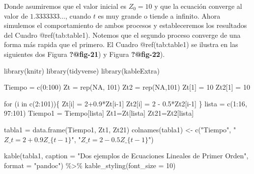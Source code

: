 \documentclass[
  a4paper,
]{article}
\newenvironment{Shaded}{}{}
\newcommand{\AttributeTok}[1]{\textcolor[rgb]{0.84,0.23,0.29}{#1}}
\newcommand{\ConstantTok}[1]{\textcolor[rgb]{0.00,0.36,0.77}{#1}}
\newcommand{\ControlFlowTok}[1]{\textcolor[rgb]{0.84,0.23,0.29}{#1}}
\newcommand{\DecValTok}[1]{\textcolor[rgb]{0.00,0.36,0.77}{#1}}
\newcommand{\FloatTok}[1]{\textcolor[rgb]{0.00,0.36,0.77}{#1}}
\newcommand{\FunctionTok}[1]{\textcolor[rgb]{0.44,0.26,0.76}{#1}}
\newcommand{\NormalTok}[1]{\textcolor[rgb]{0.14,0.16,0.18}{#1}}
\newcommand{\OtherTok}[1]{\textcolor[rgb]{0.44,0.26,0.76}{#1}}
\newcommand{\SpecialCharTok}[1]{\textcolor[rgb]{0.00,0.36,0.77}{#1}}
\newcommand{\StringTok}[1]{\textcolor[rgb]{0.01,0.18,0.38}{#1}}
\begin{document}
Donde asumiremos que el valor inicial es \(Z_0 = 10\) y que la ecuación
converge al valor de \(1.3333333 \ldots\), cuando \(t\) es muy grande o
tiende a infinito. Ahora simulemos el comportamiento de ambos procesos y
estableceremos los resultados del Cuadro @ref(tab:table1). Notemos que
el segundo proceso converge de una forma más rapida que el primero. El
Cuadro @ref(tab:table1) se ilustra en las siguientes dos Figura
\textbf{?@fig-21}) y Figura \textbf{?@fig-22}).

\begin{Shaded}
\begin{Highlighting}[]
\FunctionTok{library}\NormalTok{(knitr)}
\FunctionTok{library}\NormalTok{(tidyverse)}
\FunctionTok{library}\NormalTok{(kableExtra)}

\NormalTok{Tiempo }\OtherTok{=} \FunctionTok{c}\NormalTok{(}\DecValTok{0}\SpecialCharTok{:}\DecValTok{100}\NormalTok{)}
\NormalTok{Zt }\OtherTok{=} \FunctionTok{rep}\NormalTok{(}\ConstantTok{NA}\NormalTok{, }\DecValTok{101}\NormalTok{)}
\NormalTok{Zt2 }\OtherTok{=} \FunctionTok{rep}\NormalTok{(}\ConstantTok{NA}\NormalTok{,}\DecValTok{101}\NormalTok{)}
\NormalTok{Zt[}\DecValTok{1}\NormalTok{] }\OtherTok{=} \DecValTok{10}
\NormalTok{Zt2[}\DecValTok{1}\NormalTok{] }\OtherTok{=} \DecValTok{10}

\ControlFlowTok{for}\NormalTok{ (i }\ControlFlowTok{in} \FunctionTok{c}\NormalTok{(}\DecValTok{2}\SpecialCharTok{:}\DecValTok{101}\NormalTok{))\{}
\NormalTok{  Zt[i] }\OtherTok{=} \DecValTok{2}\FloatTok{+0.9}\SpecialCharTok{*}\NormalTok{Zt[i}\DecValTok{{-}1}\NormalTok{]}
\NormalTok{  Zt2[i] }\OtherTok{=} \DecValTok{2} \SpecialCharTok{{-}} \FloatTok{0.5}\SpecialCharTok{*}\NormalTok{Zt2[i}\DecValTok{{-}1}\NormalTok{]}
\NormalTok{\}}
\NormalTok{lista }\OtherTok{=} \FunctionTok{c}\NormalTok{(}\DecValTok{1}\SpecialCharTok{:}\DecValTok{16}\NormalTok{, }\DecValTok{97}\SpecialCharTok{:}\DecValTok{101}\NormalTok{)}
\NormalTok{Tiempo1 }\OtherTok{=}\NormalTok{ Tiempo[lista]}
\NormalTok{Zt1}\OtherTok{=}\NormalTok{Zt[lista]}
\NormalTok{Zt21}\OtherTok{=}\NormalTok{Zt2[lista]}

\NormalTok{tabla1 }\OtherTok{=} \FunctionTok{data.frame}\NormalTok{(Tiempo1, Zt1, Zt21)}
\FunctionTok{colnames}\NormalTok{(tabla1) }\OtherTok{\textless{}{-}} \FunctionTok{c}\NormalTok{(}\StringTok{"Tiempo"}\NormalTok{, }\StringTok{"$Z\_t =2+0.9Z\_\{t{-}1\}$"}\NormalTok{, }
                      \StringTok{"$Z\_t = 2{-}0.5Z\_\{t{-}1\}$"}\NormalTok{)}

\FunctionTok{kable}\NormalTok{(tabla1, }
      \AttributeTok{caption =} \StringTok{"Dos ejemplos de Ecuaciones Lineales de Primer Orden"}\NormalTok{, }
      \AttributeTok{format =} \StringTok{"pandoc"}\NormalTok{) }\SpecialCharTok{\%\textgreater{}\%}
  \FunctionTok{kable\_styling}\NormalTok{(}\AttributeTok{font\_size =} \DecValTok{10}\NormalTok{)}
\end{Highlighting}
\end{Shaded}
\end{document}
